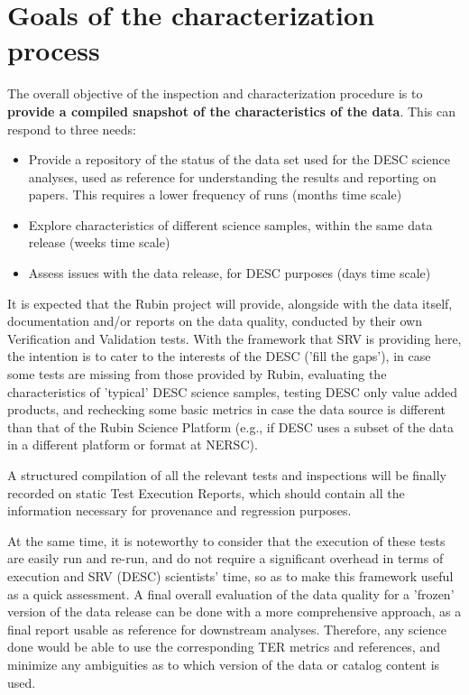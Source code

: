 \documentclass[12pt, a4paper]{article}
\begin{document}
\section{Goals of the characterization process}

The overall objective of the inspection and characterization procedure is to \textbf{provide a compiled snapshot of the characteristics of the data}. This can respond to three needs:

\begin{itemize}
	\item Provide a repository of the status of the data set used for the DESC science analyses, used as reference for understanding the results and reporting on papers. This requires a lower frequency of runs (months time scale)
	\item Explore characteristics of different science samples, within the same data release (weeks time scale)
	\item Assess issues with the data release, for DESC purposes (days time scale)
\end{itemize}

It is expected that the Rubin project will provide, alongside with the data itself, documentation and/or reports on the data quality, conducted by their own Verification and Validation tests. With the framework that SRV is providing here, the intention is to cater to the interests of the DESC ('fill the gaps'), in case some tests are missing from those provided by Rubin, evaluating the characteristics of 'typical' DESC science samples, testing DESC only value added products, and rechecking some basic metrics in case the data source is different than that of the Rubin Science Platform (e.g., if DESC uses a subset of the data in a different platform or format at NERSC).

A structured compilation of all the relevant tests and inspections will be finally recorded on static Test Execution Reports, which should contain all the information necessary for provenance and regression purposes.

At the same time, it is noteworthy to consider that the execution of these tests are easily run and re-run, and do not require a significant overhead in terms of execution and SRV (DESC) scientists' time, so as to make this framework useful as a quick assessment. A final overall evaluation of the data quality for a 'frozen' version of the data release can be done with a more comprehensive approach, as a final report usable as reference for downstream analyses. Therefore, any science done would be able to use the corresponding TER metrics and references, and minimize any ambiguities as to which version of the data or catalog content is used.
\end{document}
